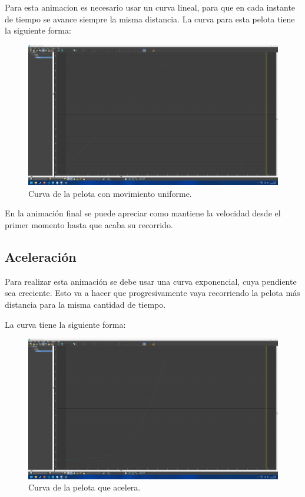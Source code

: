 \documentclass{article}
\begin{document}
Para esta animacion es necesario usar un curva lineal, para que en cada instante de tiempo se avance siempre la misma distancia. La curva para esta pelota tiene la siguiente forma:

\begin{figure}[H]
   \centering
   \includegraphics[width=\textwidth]{imagenes/Ejercicio 1/curvas/uniforme.png}
   \caption{Curva de la pelota con movimiento uniforme.}
\end{figure}

En la animación final se puede apreciar como mantiene la velocidad desde el primer momento hasta que acaba su recorrido.

\subsection{Aceleración}

Para realizar esta animación se debe usar una curva exponencial, cuya pendiente sea creciente. Esto va a hacer que progresivamente vaya recorriendo la pelota más distancia para la misma cantidad de tiempo. 

La curva tiene la siguiente forma:

\begin{figure}[H]
    \centering
    \includegraphics[width=\textwidth]{imagenes/Ejercicio 1/curvas/aceleracion.png}
    \caption{Curva de la pelota que acelera.}
 \end{figure}
\end{document}
